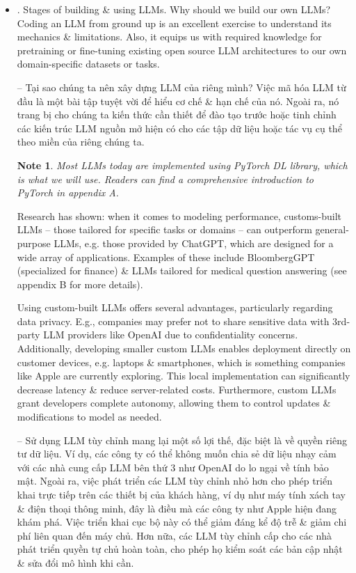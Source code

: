 \documentclass{article}
\newtheorem{note}{Note}
\begin{document}
\begin{itemize}
\begin{itemize}
		Will focus on understanding how LLMs work from ground up, coding an LLM that can generate texts. Will also learn about techniques that allow LLMs to carry out queries, ranging from answering questions to summarizing text, translating text into different languages, \& more. I.e., will learn how complex LLM assistants e.g. ChatGPT work by building 1 step by step.
		\item {. Stages of building \& using LLMs.} Why should we build our own LLMs? Coding an LLM from ground up is an excellent exercise to understand its mechanics \& limitations. Also, it equips us with required knowledge for pretraining or fine-tuning existing open source LLM architectures to our own domain-specific datasets or tasks.
		
		-- Tại sao chúng ta nên xây dựng LLM của riêng mình? Việc mã hóa LLM từ đầu là một bài tập tuyệt vời để hiểu cơ chế \& hạn chế của nó. Ngoài ra, nó trang bị cho chúng ta kiến thức cần thiết để đào tạo trước hoặc tinh chỉnh các kiến trúc LLM nguồn mở hiện có cho các tập dữ liệu hoặc tác vụ cụ thể theo miền của riêng chúng ta.
		\begin{note}
			Most LLMs today are implemented using PyTorch DL library, which is what we will use. Readers can find a comprehensive introduction to PyTorch in appendix A.
		\end{note}
		Research has shown: when it comes to modeling performance, customs-built LLMs -- those tailored for specific tasks or domains -- can outperform general-purpose LLMs, e.g. those provided by ChatGPT, which are designed for a wide array of applications. Examples of these include BloombergGPT (specialized for finance) \& LLMs tailored for medical question answering (see appendix B for more details).
		
		Using custom-built LLMs offers several advantages, particularly regarding data privacy. E.g., companies may prefer not to share sensitive data with 3rd-party LLM providers like OpenAI due to confidentiality concerns. Additionally, developing smaller custom LLMs enables deployment directly on customer devices, e.g. laptops \& smartphones, which is something companies like Apple are currently exploring. This local implementation can significantly decrease latency \& reduce server-related costs. Furthermore, custom LLMs grant developers complete autonomy, allowing them to control updates \& modifications to model as needed.
		
		-- Sử dụng LLM tùy chỉnh mang lại một số lợi thế, đặc biệt là về quyền riêng tư dữ liệu. Ví dụ, các công ty có thể không muốn chia sẻ dữ liệu nhạy cảm với các nhà cung cấp LLM bên thứ 3 như OpenAI do lo ngại về tính bảo mật. Ngoài ra, việc phát triển các LLM tùy chỉnh nhỏ hơn cho phép triển khai trực tiếp trên các thiết bị của khách hàng, ví dụ như máy tính xách tay \& điện thoại thông minh, đây là điều mà các công ty như Apple hiện đang khám phá. Việc triển khai cục bộ này có thể giảm đáng kể độ trễ \& giảm chi phí liên quan đến máy chủ. Hơn nữa, các LLM tùy chỉnh cấp cho các nhà phát triển quyền tự chủ hoàn toàn, cho phép họ kiểm soát các bản cập nhật \& sửa đổi mô hình khi cần.
		

\end{itemize}
\end{itemize}
\end{document}
